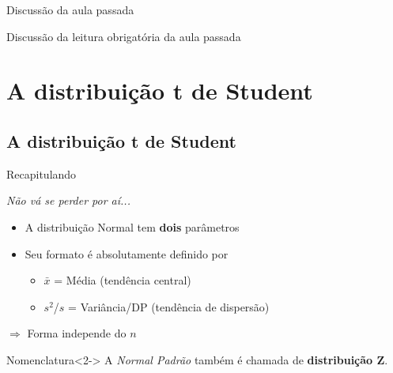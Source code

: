 \documentclass{beamer}
\begin{document}

\begin{frame}{\scriptsize Discussão da aula passada}
  \begin{block}{}
    Discussão da leitura obrigatória da aula passada
  \end{block}
\end{frame}

\section[t de Student]{A distribuição t de Student}

\subsection{A distribuição t de Student}

\begin{frame}{\scriptsize Recapitulando}
  \begin{block}{\em Não vá se perder por aí...}
    \begin{itemize}
      \footnotesize
    \item A distribuição Normal tem {\bf dois} parâmetros
    \item Seu formato é absolutamente definido por
      \begin{itemize}
        \scriptsize
      \item $\bar{x}$ = Média {\tiny (tendência central)}
      \item $s^2$/$s$ = Variância/DP {\tiny (tendência de dispersão)}
      \end{itemize}
    \end{itemize}
    \begin{center}
      $\Rightarrow$ Forma \alert{independe} do $n$
    \end{center}
  \end{block}
  \begin{block}{Nomenclatura}<2->
    \small
    A {\em Normal Padrão} também é chamada de {\bf distribuição Z}.
  \end{block}
\end{frame}
\end{document}
